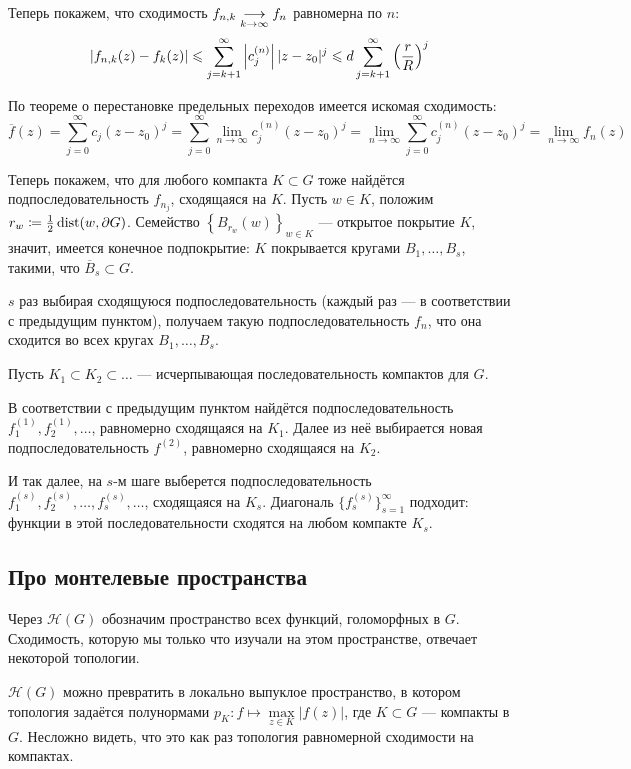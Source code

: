 \documentclass[a4paper]{report}
\begin{document}
{{{{    Теперь покажем, что сходимость $f_{n,k} \underset{k \to \infty}{\longrightarrow} f_n$ равномерна по $n$:
    \[\left|f_{n,k}(z) - f_k(z)\right| \leqslant \sum\limits_{j = k + 1}^{\infty}\left|c_j^{(n)}\right||z - z_0|^j \leqslant d\sum\limits_{j = k + 1}^{\infty}\left(\frac{r}{R}\right)^j\]
    \item По теореме о перестановке предельных переходов имеется искомая сходимость: \[\overline{f}(z) = \sum\limits_{j = 0}^{\infty}c_j (z - z_0)^{j} = \sum\limits_{j = 0}^{\infty}\lim\limits_{n \to \infty}c_j^{(n)} (z - z_0)^{j} = \lim\limits_{n \to \infty}\sum\limits_{j = 0}^{\infty}c_j^{(n)} (z - z_0)^{j} = \lim\limits_{n \to \infty} f_n(z)\]
    }
    \item Теперь покажем, что для любого компакта $K \subset G$ тоже найдётся подпоследовательность $f_{n_j}$, сходящаяся на $K$.
    Пусть $w \in K$, положим $r_w \coloneqq \frac{1}{2}\operatorname{dist}(w, \partial G)$.
        Семейство $\left\{B_{r_w}(w)\right\}_{w \in K}$ --- открытое покрытие $K$, значит, имеется конечное подпокрытие: $K$ покрывается кругами $B_1, \dots, B_s$, такими, что $\overline{B}_s \subset G$.

    $s$ раз выбирая сходящуюся подпоследовательность (каждый раз --- в соответствии с предыдущим пунктом), получаем такую подпоследовательность $f_n$, что она сходится во всех кругах $B_1, \dots, B_s$.
    \item Пусть $K_1 \subset K_2 \subset \dots$ --- исчерпывающая последовательность компактов для $G$.

    В соответствии с предыдущим пунктом найдётся подпоследовательность $f_1^{(1)}, f_2^{(1)}, \dots$, равномерно сходящаяся на $K_1$.
    Далее из неё выбирается новая подпоследовательность $f^{(2)}$, равномерно сходящаяся на $K_2$.

    И так далее, на $s$-м шаге выберется подпоследовательность $f^{(s)}_1, f^{(s)}_2, \dots, f^{(s)}_s, \dots$, сходящаяся на $K_s$.
    Диагональ $\{f_s^{(s)}\}_{s = 1}^{\infty}$ подходит: функции в этой последовательности сходятся на любом компакте $K_s$.\qedhere
    }
    }
    }
    \subsection{Про монтелевые пространства}
    Через $\mathcal{H}(G)$ обозначим пространство всех функций, голоморфных в $G$.
    Сходимость, которую мы только что изучали на этом пространстве, отвечает некоторой топологии.

    $\mathcal{H}(G)$ можно превратить в локально выпуклое пространство, в котором топология задаётся полунормами $p_K: f \mapsto \max\limits_{z \in K}|f(z)|$, где $K \subset G$ --- компакты в $G$.
    Несложно видеть, что это как раз топология равномерной сходимости на компактах.
\end{document}
